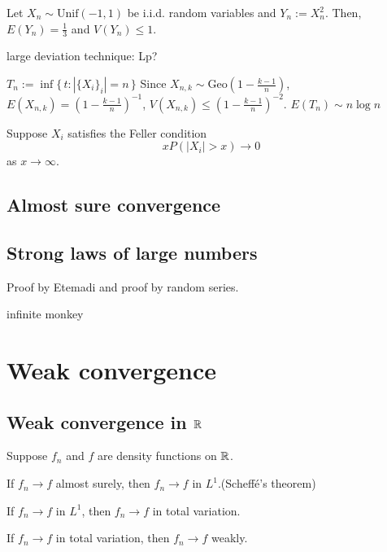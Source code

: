 \documentclass{../note}
\def\Unif{\mathrm{Unif}}
\def\Geo{\mathrm{Geo}}
\begin{document}
\begin{prb}
Let $X_n\sim\Unif(-1,1)$ be i.i.d. random variables and $Y_n:=X_n^2$.
Then, $E(Y_n)=\frac13$ and $V(Y_n)\le1$.

\end{prb}

large deviation technique: Lp?

\begin{prb}
$T_n:=\inf\{\,t:|\{X_i\}_i|=n\,\}$
Since $X_{n,k}\sim\Geo(1-\frac{k-1}n)$, $E(X_{n,k})=(1-\frac{k-1}n)^{-1}$, $V(X_{n,k})\le(1-\frac{k-1}n)^{-2}$.
$E(T_n)\sim n\log n$
\end{prb}
\begin{prb}
\end{prb}
\begin{prb}
\end{prb}

\begin{prb}
Suppose $X_i$ satisfies the Feller condition
\[xP(|X_i|>x)\to0\]
as $x\to\infty$.
\begin{parts}
\item
\end{parts}
\end{prb}



\section{Almost sure convergence}



\section{Strong laws of large numbers}

Proof by Etemadi and proof by random series.

infinite monkey












\chapter{Weak convergence}


\section{Weak convergence in $\mathbb{R}$}
\begin{prb}
Suppose $f_n$ and $f$ are density functions on $\mathbb{R}$.
\begin{parts}
\item If $f_n\to f$ almost surely, then $f_n\to f$ in $L^1$.\hfill(Scheff\'e's theorem)
\item If $f_n\to f$ in $L^1$, then $f_n\to f$ in total variation.
\item If $f_n\to f$ in total variation, then $f_n\to f$ weakly.
\end{parts}
\end{prb}
\end{document}
